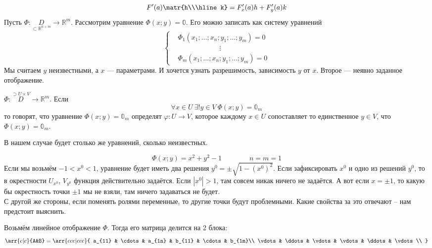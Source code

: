 \documentclass{article}
\begin{document}
\begin{itemize}
\begin{Comment}
            $$
            F'(a)\matr{h\\\hline k}=F'_x(a)h+F'_y(a)k
            $$
            Пусть $\Phi\colon\underset{\subset\mathbb R^{n+m}}D\to\mathbb R^m$. Рассмотрим уравнение $\Phi(x;y)=\mathbb0$. Его можно записать как систему уравнений
            \[\left\{\begin{aligned}
                &\Phi_1(x_1;\ldots;x_n;y_1;\ldots;y_m)=0\\
                &\qquad\qquad\qquad\vdots\\
                &\Phi_m(x_1;\ldots;x_n;y_1;\ldots;y_m)=0
            \end{aligned}\right.\]
            Мы считаем $y$ неизвестными, а $x$ --- параметрами. И хочется узнать разрешимость, зависимость $y$ от $x$. Второе --- неявно заданное отображение.
        \end{Comment}
        \dfn $\Phi\colon\overset{\supset U\times V}D\to\mathbb R^m$. Если
        $$\forall x\in U~\exists!y\in V~\Phi(x;y)=\mathbb0_m$$
        то говорят, что уравнение $\Phi(x;y)=\mathbb0_m$ определят  $\varphi\colon U\to V$, которое каждому $x\in U$ сопоставляет то единственное $y\in V$, что $\Phi(x;y)=\mathbb0_m$.
        \begin{Comment}
            В нашем случае будет столько же уравнений, сколько неизвестных.
        \end{Comment}
        \begin{Example}
            $$
            \Phi(x;y)=x^2+y^2-1\qquad\qquad n=m=1
            $$
            Если мы возьмём $-1<x^0<1$, уравнение будет иметь два решения $y^0=\pm\sqrt{1-(x^0)^2}$. Если зафиксировать $x^0$ и одно из решений $y^0$, то в окрестности $U_{x^0}$, $V_{y^0}$ функция действительно задаётся. Если $|x^0|>1$, там совсем никак ничего не задаётся. А вот если $x=\pm1$, то какую бы окрестность точки $\pm1$ мы не взяли, там ничего задаваться не будет.\\
            С другой же стороны, если поменять ролями переменные, то другие точки будут проблемными. Какие свойства за это отвечают -- нам предстоит выяснить.
        \end{Example}
        \begin{Example}
            Возьмём линейное отображение $\Phi$. Тогда его матрица делится на 2 блока:
            $$\arr{c|c}{A&B}=\arr{ccc|ccc}{
                a_{11} & \cdots & a_{1n} & b_{11} & \cdots & b_{1m}\\
                \vdots & \ddots & \vdots & \vdots & \ddots & \vdots\\
}$$
\end{Example}
\end{itemize}
\end{document}
